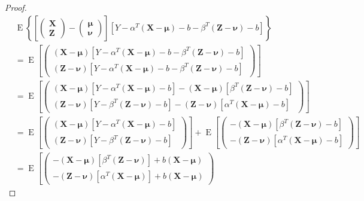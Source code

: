 \begin{proof}
\begin{align*}
		&\operatorname{E}\left\{\left[
		\begin{pmatrix}
			\mathbf{X} \\
			\mathbf{Z}
		\end{pmatrix}-
		\begin{pmatrix}
			\boldsymbol{\mu} \\
			\boldsymbol{\nu}
		\end{pmatrix}
		\right][Y-\alpha^T(\mathbf{X}-\boldsymbol{\mu})-b-\beta^T(\mathbf{Z}-\boldsymbol{\nu})-b]\right\} \\
		&=\operatorname{E}\left[
		\begin{pmatrix}
			(\mathbf{X}-\boldsymbol{\mu})[Y-\alpha^T(\mathbf{X}-\boldsymbol{\mu})-b-\beta^T(\mathbf{Z}-\boldsymbol{\nu})-b] \\
			(\mathbf{Z}-\boldsymbol{\nu})[Y-\alpha^T(\mathbf{X}-\boldsymbol{\mu})-b-\beta^T(\mathbf{Z}-\boldsymbol{\nu})-b]
		\end{pmatrix}
		\right] \\
		&=\operatorname{E}\left[
		\begin{pmatrix}
			(\mathbf{X}-\boldsymbol{\mu})[Y-\alpha^T(\mathbf{X}-\boldsymbol{\mu})-b]-(\mathbf{X}-\boldsymbol{\mu})[\beta^T(\mathbf{Z}-\boldsymbol{\nu})-b] \\
			(\mathbf{Z}-\boldsymbol{\nu})[Y-\beta^T(\mathbf{Z}-\boldsymbol{\nu})-b]-(\mathbf{Z}-\boldsymbol{\nu})[\alpha^T(\mathbf{X}-\boldsymbol{\mu})-b]
		\end{pmatrix}
		\right] \\
		&=\operatorname{E}\left[
		\begin{pmatrix}
			(\mathbf{X}-\boldsymbol{\mu})[Y-\alpha^T(\mathbf{X}-\boldsymbol{\mu})-b] \\
			(\mathbf{Z}-\boldsymbol{\nu})[Y-\beta^T(\mathbf{Z}-\boldsymbol{\nu})-b]
		\end{pmatrix}
		\right]+\operatorname{E}\left[
		\begin{pmatrix}
			-(\mathbf{X}-\boldsymbol{\mu})[\beta^T(\mathbf{Z}-\boldsymbol{\nu})-b] \\
			-(\mathbf{Z}-\boldsymbol{\nu})[\alpha^T(\mathbf{X}-\boldsymbol{\mu})-b]
		\end{pmatrix}
		\right] \\
		&=\operatorname{E}\left[
		\begin{pmatrix}
			-(\mathbf{X}-\boldsymbol{\mu})[\beta^T(\mathbf{Z}-\boldsymbol{\nu})]+b(\mathbf{X}-\boldsymbol{\mu}) \\
			-(\mathbf{Z}-\boldsymbol{\nu})[\alpha^T(\mathbf{X}-\boldsymbol{\mu})]+b(\mathbf{X}-\boldsymbol{\mu})

\end{pmatrix}
\end{align*}
\end{proof}
